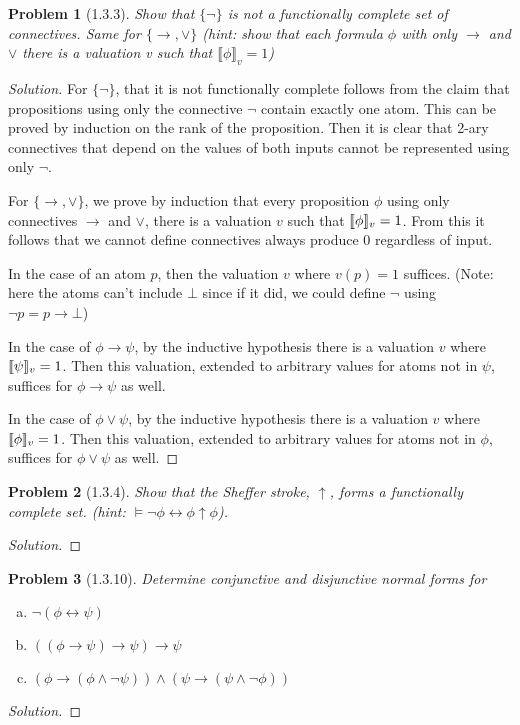 \documentclass[letter]{article}
\newtheorem{problem}{Problem}
\theoremstyle{definition}
\newenvironment{solution}
{\begin{proof}[Solution]}
	{\end{proof}}
\begin{document}
\begin{problem}[1.3.3] Show that $\{ \neg \}$ is not a functionally complete set of connectives. Same for $\{\to, \lor\}$ (hint: show that each formula $\phi$ with only $\to$ and $\lor$ there is a valuation v such that $\llbracket \phi \rrbracket_v = 1$)
\end{problem}
\begin{solution}
  For $\{ \neg \}$, that it is not functionally complete follows from the claim that propositions using only the connective $\neg$ contain exactly one atom. This can be proved by induction on the rank of the proposition. Then it is clear that 2-ary connectives that depend on the values of both inputs cannot be represented using only $\neg$.

  For $\{\to, \lor\}$, we prove by induction that every proposition $\phi$ using only connectives $\to$ and $\lor$, there is a valuation $v$ such that $\llbracket \phi \rrbracket_v = 1$. From this it follows that we cannot define connectives always produce 0 regardless of input.

  In the case of an atom $p$, then the valuation $v$ where $v(p) = 1$ suffices. (Note: here the atoms can't include $\bot$ since if it did, we could define $\neg$ using $\neg p = p \to \bot$)

  In the case of $\phi \to \psi$, by the inductive hypothesis there is a valuation $v$ where $\llbracket \psi \rrbracket_v = 1$. Then this valuation, extended to arbitrary values for atoms not in $\psi$, suffices for $\phi \to \psi$ as well.

  In the case of $\phi \lor \psi$, by the inductive hypothesis there is a valuation $v$ where $\llbracket \phi \rrbracket_v = 1$. Then this valuation, extended to arbitrary values for atoms not in $\phi$, suffices for $\phi \lor \psi$ as well.
\end{solution}

\begin{problem}[1.3.4] Show that the Sheffer stroke, $\uparrow$, forms a functionally complete set. (hint: $\models \neg \phi \leftrightarrow \phi \uparrow \phi$).
\end{problem}
\begin{solution}
\end{solution}


\begin{problem}[1.3.10] Determine conjunctive and disjunctive normal forms for
\begin{enumerate}[(a)]
    \item $\neg (\phi \leftrightarrow \psi)$
    \item $((\phi \to \psi) \to \psi) \to \psi$
    \item $(\phi \to (\phi \land \neg \psi)) \land (\psi \to (\psi \land \neg \phi))$
\end{enumerate}
\end{problem}
\begin{solution}
\end{solution}
\end{document}
